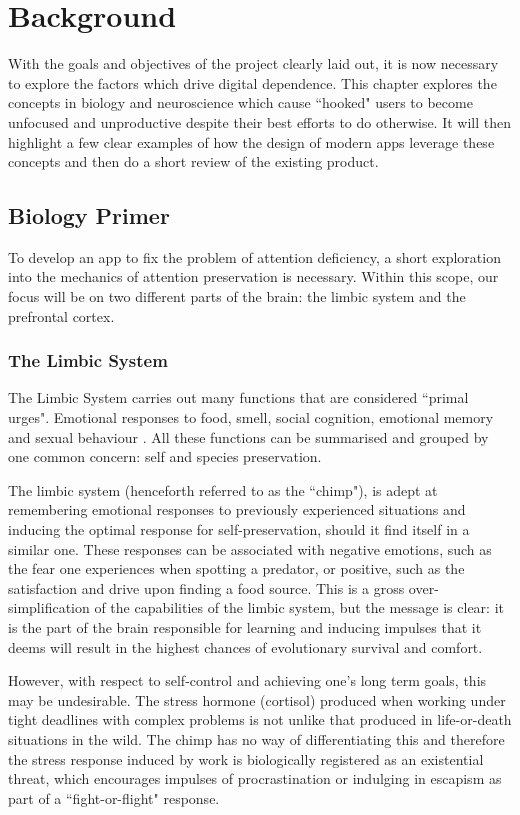 \chapter{Background}
\label{ch:background}
With the goals and objectives of the project clearly laid out, it is now necessary to explore the factors which drive digital dependence. This chapter explores the concepts in biology and neuroscience which cause ``hooked" users to become unfocused and unproductive despite their best efforts to do otherwise. It will then highlight a few clear examples of how the design of modern apps leverage these concepts and then do a short review of the existing product.

\section{Biology Primer}
To develop an app to fix the problem of attention deficiency, a short exploration into the mechanics of attention preservation is necessary.
Within this scope, our focus will be on two different parts of the brain: the limbic system and the prefrontal cortex.

\subsection{The Limbic System}
The Limbic System carries out many functions that are considered ``primal urges". Emotional responses to food, smell, social cognition, emotional memory and sexual behaviour \cite{rajmohan2007limbic}. All these functions can be summarised and grouped by one common concern: self and species preservation.

The limbic system (henceforth referred to as the ``chimp"), is adept at remembering emotional responses to previously experienced situations and inducing the optimal response for self-preservation, should it find itself in a similar one. These responses can be associated with negative emotions, such as the fear one experiences when spotting a predator, or positive, such as the satisfaction and drive upon finding a food source. This is a gross over-simplification of the capabilities of the limbic system, but the message is clear: it is the part of the brain responsible for learning and inducing impulses that it deems will result in the highest chances of evolutionary survival and comfort.

However, with respect to self-control and achieving one's long term goals, this may be undesirable. The stress hormone (cortisol) produced when working under tight deadlines with complex problems is not unlike that produced in life-or-death situations in the wild. The chimp has no way of differentiating this and therefore the stress response induced by work is biologically registered as an existential threat, which encourages impulses of procrastination or indulging in escapism as part of a ``fight-or-flight" response.

